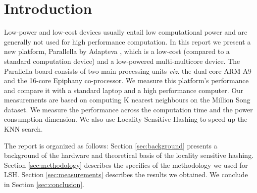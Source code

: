 \section{Introduction}
Low-power and low-cost devices usually entail low computational power and are generally not used for high performance computation. In this report we present a new platform, Parallella by Adapteva \cite{par01}, which is a low-cost (compared to a standard computation device) and a low-powered multi-multicore device. The Parallella board consists of two main processing units \textit{viz.} the dual core ARM A9 and the 16-core Epiphany co-processor. We measure this platform's performance and compare it with  a standard laptop and a high performance computer. Our measurements are based on computing K nearest neighbours on the Million Song dataset\cite{Bertin-Mahieux2011, msd01}. We measure the performance across the computation time and the power consumption dimension. We also use Locality Sensitive Hashing to speed up the KNN search.

The report is organized as follows: Section \ref{sec:background} presents a background of the hardware and theoretical basis of the locality sensitive hashing. Section \ref{sec:methodology} describes the specifics of the methodology we used for LSH. Section \ref{sec:measurements} describes the results we obtained. We conclude in Section \ref{sec:conclusion}.